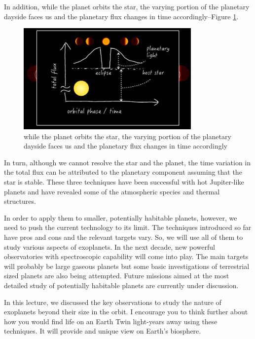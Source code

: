 \documentclass[]{article}
\begin{document}
In addition, while the planet
orbits the star,
the varying portion of the planetary
dayside faces us
and the planetary flux
changes in time accordingly--Figure \ref{fig:phase-variation}.

\begin{figure}[H]
	\begin{center}
		\caption[Phase Variation]{ while the planet orbits the star, the varying portion of the planetary dayside faces us 	and the planetary flux changes in time accordingly}\label{fig:phase-variation}
		\includegraphics[width=0.8\textwidth]{phase-variation}
	\end{center}
\end{figure}
In turn, although we cannot resolve
the star and the planet,
the time variation in the total flux
can be attributed to
the planetary component
assuming that the star is stable.
These three techniques
have been successful
with hot Jupiter-like planets
and have revealed
some of the atmospheric species
and thermal structures.

In order to apply them to smaller,
potentially habitable planets, however,
we need to push the current
technology to its limit.
The techniques introduced so far
have pros and cons
and the relevant targets vary.
So, we will use all of them
to study various aspects of exoplanets.
In the next decade,
new powerful observatories
with spectroscopic capability
will come into play.
The main targets will probably be
large gaseous planets
but some basic investigations
of terrestrial sized planets
are also being attempted.
Future missions aimed at
the most detailed study
of potentially habitable planets
are currently under discussion.

In this lecture,
we discussed the key observations
to study the nature of exoplanets
beyond their size in the orbit.
I encourage you to think further
about how you would find life
on an Earth Twin light-years away
using these techniques.
It will provide and unique view
on Earth's biosphere.
\end{document}
